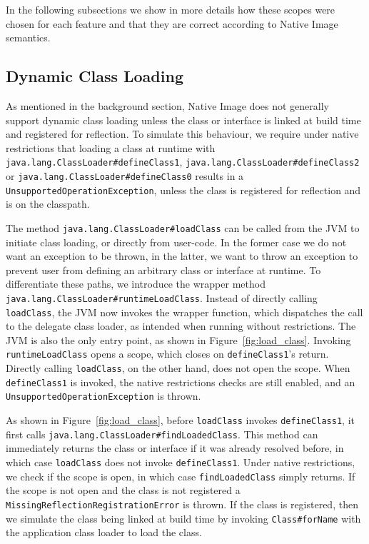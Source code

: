 In the following subsections we show in more details how these scopes were chosen for each feature and that they are correct according to Native Image semantics.

\subsection{Dynamic Class Loading}
As mentioned in the background section, Native Image does not generally support dynamic class loading unless the class or interface is linked at build time and registered for reflection. 
To simulate this behaviour, we require under native restrictions that loading a class at runtime with \verb|java.lang.ClassLoader#defineClass1|, \verb|java.lang.ClassLoader#defineClass2| or \verb|java.lang.ClassLoader#defineClass0|  results in a \verb|UnsupportedOperationException|, unless the class is registered for reflection and is on the classpath.

The method \verb|java.lang.ClassLoader#loadClass| can be called from the JVM to initiate class loading, or directly from user-code. In the former case we do not want an exception to be thrown, in the latter, we want to throw an exception to prevent user from defining an arbitrary class or interface at runtime.
To differentiate these paths, we introduce the wrapper method \verb|java.lang.ClassLoader#runtimeLoadClass|. Instead of directly calling \verb|loadClass|, the JVM now invokes the wrapper function, which dispatches the call to the delegate class loader, as intended when running without restrictions. The JVM is also the only entry point, as shown in Figure~\ref{fig:load_class}.
Invoking \verb|runtimeLoadClass| opens a scope, which closes on \verb|defineClass1|'s return.
Directly calling \verb|loadClass|, on the other hand, does not open the scope. When \verb|defineClass1| is invoked, the native restrictions checks are still enabled, and an \verb|UnsupportedOperationException| is thrown.

As shown in Figure~\ref{fig:load_class}, before \verb|loadClass| invokes \verb|defineClass1|, it first calls \verb|java.lang.ClassLoader#findLoadedClass|. This method can immediately returns the class or interface if it was already resolved before, in which case \verb|loadClass| does not invoke \verb|defineClass1|.
Under native restrictions, we check if the scope is open, in which case \verb|findLoadedClass| simply returns. If the scope is not open and the class is not registered a \verb|MissingReflectionRegistrationError| is thrown.
If the class is registered, then we simulate the class being linked at build time by invoking \verb|Class#forName| with the application class loader to load the class. 

